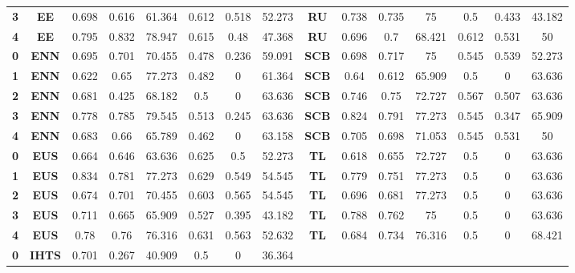 {{\begin{tabular}{c|c|cccccc|ccccccc}
\textbf{3} & \textbf{EE} & 0.698 & 0.616 & 61.364 & 0.612 & 0.518 & 52.273 & \multicolumn{1}{c|}{\textbf{RU}} & 0.738 & 0.735 & 75    & 0.5   & 0.433 & 43.182 \\
\textbf{4} & \textbf{EE} & 0.795 & 0.832 & 78.947 & 0.615 & 0.48  & 47.368 & \multicolumn{1}{c|}{\textbf{RU}} & 0.696 & 0.7   & 68.421 & 0.612 & 0.531 & 50 \\
\textbf{0} & \textbf{ENN} & 0.695 & 0.701 & 70.455 & 0.478 & 0.236 & 59.091 & \multicolumn{1}{c|}{\textbf{SCB}} & 0.698 & 0.717 & 75    & 0.545 & 0.539 & 52.273 \\
\textbf{1} & \textbf{ENN} & 0.622 & 0.65  & 77.273 & 0.482 & 0     & 61.364 & \multicolumn{1}{c|}{\textbf{SCB}} & 0.64  & 0.612 & 65.909 & 0.5   & 0     & 63.636 \\
\textbf{2} & \textbf{ENN} & 0.681 & 0.425 & 68.182 & 0.5   & 0     & 63.636 & \multicolumn{1}{c|}{\textbf{SCB}} & 0.746 & 0.75  & 72.727 & 0.567 & 0.507 & 63.636 \\
\textbf{3} & \textbf{ENN} & 0.778 & 0.785 & 79.545 & 0.513 & 0.245 & 63.636 & \multicolumn{1}{c|}{\textbf{SCB}} & 0.824 & 0.791 & 77.273 & 0.545 & 0.347 & 65.909 \\
\textbf{4} & \textbf{ENN} & 0.683 & 0.66  & 65.789 & 0.462 & 0     & 63.158 & \multicolumn{1}{c|}{\textbf{SCB}} & 0.705 & 0.698 & 71.053 & 0.545 & 0.531 & 50 \\
\textbf{0} & \textbf{EUS} & 0.664 & 0.646 & 63.636 & 0.625 & 0.5   & 52.273 & \multicolumn{1}{c|}{\textbf{TL}} & 0.618 & 0.655 & 72.727 & 0.5   & 0     & 63.636 \\
\textbf{1} & \textbf{EUS} & 0.834 & 0.781 & 77.273 & 0.629 & 0.549 & 54.545 & \multicolumn{1}{c|}{\textbf{TL}} & 0.779 & 0.751 & 77.273 & 0.5   & 0     & 63.636 \\
\textbf{2} & \textbf{EUS} & 0.674 & 0.701 & 70.455 & 0.603 & 0.565 & 54.545 & \multicolumn{1}{c|}{\textbf{TL}} & 0.696 & 0.681 & 77.273 & 0.5   & 0     & 63.636 \\
\textbf{3} & \textbf{EUS} & 0.711 & 0.665 & 65.909 & 0.527 & 0.395 & 43.182 & \multicolumn{1}{c|}{\textbf{TL}} & 0.788 & 0.762 & 75    & 0.5   & 0     & 63.636 \\
\textbf{4} & \textbf{EUS} & 0.78  & 0.76  & 76.316 & 0.631 & 0.563 & 52.632 & \multicolumn{1}{c|}{\textbf{TL}} & 0.684 & 0.734 & 76.316 & 0.5   & 0     & 68.421 \\
\textbf{0} & \textbf{IHTS} & 0.701 & 0.267 & 40.909 & 0.5   & 0     & 36.364 &       &       &       &       &       &       &  \\

\end{tabular}}}
